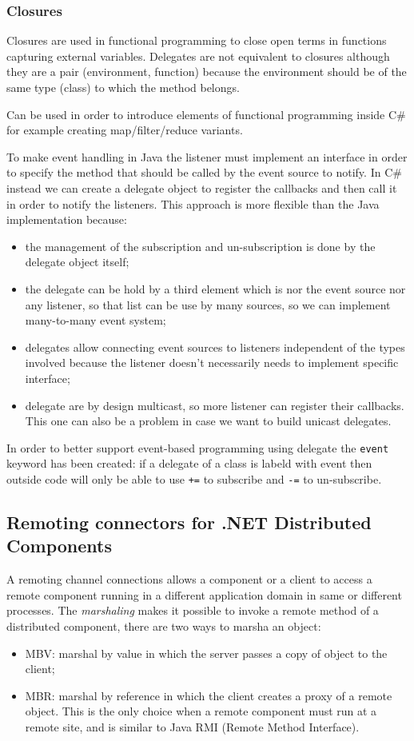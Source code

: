 \subsubsection{Closures}
Closures are used in functional programming to close open terms in functions capturing external variables.
Delegates are not equivalent to closures although they are a pair (environment, function) because the environment should be of the same type (class) to which the method belongs.

Can be used in order to introduce elements of functional programming inside C\# for example creating map/filter/reduce variants.

To make event handling in Java the listener must implement an interface in order to specify the method that should be called by the event source to notify.
In C\# instead we can create a delegate object to register the callbacks and then call it in order to notify the listeners.
This approach is more flexible than the Java implementation because:
\begin{itemize}
    \item the management of the subscription and un-subscription is done by the delegate object itself;
    \item the delegate can be hold by a third element which is nor the event source nor any listener, so that list can be use by many sources, so we can implement many-to-many event system;
    \item delegates allow connecting event sources to listeners independent of the types involved because the listener doesn't necessarily needs to implement specific interface;
    \item delegate are by design multicast, so more listener can register their callbacks.
    This one can also be a problem in case we want to build unicast delegates.
\end{itemize}

In order to better support event-based programming using delegate the \verb|event| keyword has been created: if a delegate of a class is labeld with event then outside code will only be able to use \verb|+=| to subscribe and \verb|-=| to un-subscribe.

\subsection{Remoting connectors for .NET Distributed Components}
A remoting channel connections allows a component or a client to access a remote component running in a different application domain in same or different processes.
The \emph{marshaling} makes it possible to invoke a remote method of a distributed component, there are two ways to marsha an object:
\begin{itemize}
    \item MBV: marshal by value in which the server passes a copy of object to the client;
    \item MBR: marshal by reference in which the client creates a proxy of a remote object.
    This is the only choice when a remote component must run at a remote site, and is similar to Java RMI (Remote Method Interface).
\end{itemize}


